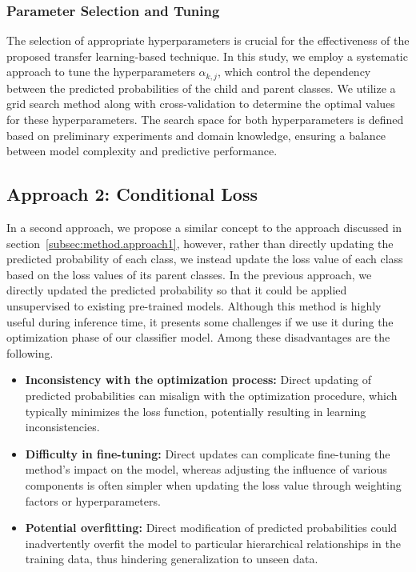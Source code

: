 \subsubsection{Parameter Selection and Tuning}
The selection of appropriate hyperparameters is crucial for the effectiveness of the proposed transfer learning-based technique. In this study, we employ a systematic approach to tune the hyperparameters $\alpha_{k,j} $, which control the dependency between the predicted probabilities of the child and parent classes. We utilize a grid search method along with cross-validation to determine the optimal values for these hyperparameters. The search space for both hyperparameters is defined based on preliminary experiments and domain knowledge, ensuring a balance between model complexity and predictive performance.

\subsection{Approach 2: Conditional Loss}\label{subsec:taxonomy.method.approach2}
In a second approach, we propose a similar concept to the approach discussed in section~\ref{subsec:method.approach1}, however, rather than directly updating the predicted probability of each class, we instead update the loss value of each class based on the loss values of its parent classes. In the previous approach, we directly updated the predicted probability so that it could be applied unsupervised to existing pre-trained models. Although this method is highly useful during inference time, it presents some challenges if we use it during the optimization phase of our classifier model. Among these disadvantages are the following.
\begin{itemize}
    \item \textbf{Inconsistency with the optimization process: } Direct updating of predicted probabilities can misalign with the optimization procedure, which typically minimizes the loss function, potentially resulting in learning inconsistencies.
    \item \textbf{Difficulty in fine-tuning:} Direct updates can complicate fine-tuning the method's impact on the model, whereas adjusting the influence of various components is often simpler when updating the loss value through weighting factors or hyperparameters.
    \item \textbf{Potential overfitting:} Direct modification of predicted probabilities could inadvertently overfit the model to particular hierarchical relationships in the training data, thus hindering generalization to unseen data.
\end{itemize}


